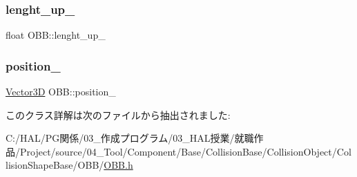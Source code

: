 \mbox{\label{class_o_b_b_a4c7f9246708424221b38051cc763ca3c}} 
\subsubsection{\texorpdfstring{lenght\+\_\+up\+\_\+}{lenght\_up\_}}
{\footnotesize\ttfamily float O\+B\+B\+::lenght\+\_\+up\+\_\+}

\mbox{\label{class_o_b_b_ab05a884fc030d7a3cf7b355880d9194c}} 
\subsubsection{\texorpdfstring{position\+\_\+}{position\_}}
{\footnotesize\ttfamily \mbox{\hyperlink{class_vector3_d}{Vector3D}} O\+B\+B\+::position\+\_\+}



このクラス詳解は次のファイルから抽出されました\+:\begin{DoxyCompactItemize}
\item 
C\+:/\+H\+A\+L/\+P\+G関係/03\+\_\+作成プログラム/03\+\_\+\+H\+A\+L授業/就職作品/\+Project/source/04\+\_\+\+Tool/\+Component/\+Base/\+Collision\+Base/\+Collision\+Object/\+Collision\+Shape\+Base/\+O\+B\+B/\mbox{\hyperlink{_o_b_b_8h}{O\+B\+B.\+h}}\end{DoxyCompactItemize}
